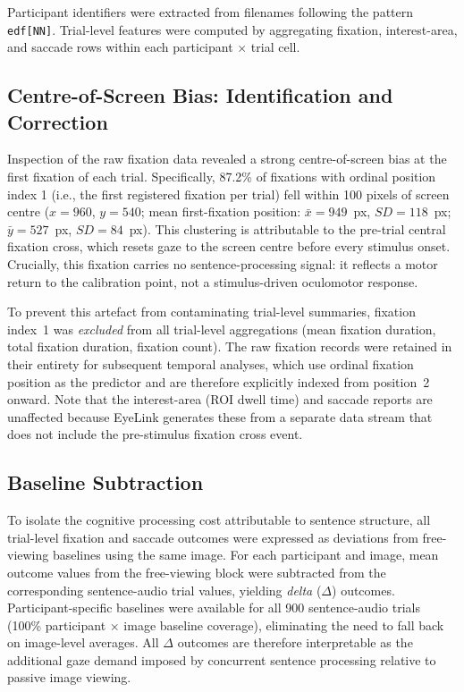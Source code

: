 \documentclass[12pt, a4paper]{article}
\begin{document}
Participant identifiers were extracted from filenames following the pattern
\texttt{edf[NN]}.
Trial-level features were computed by aggregating fixation, interest-area,
and saccade rows within each participant $\times$ trial cell.

\subsection{Centre-of-Screen Bias: Identification and Correction}

Inspection of the raw fixation data revealed a strong centre-of-screen
bias at the first fixation of each trial.
Specifically, 87.2\% of fixations with ordinal position index 1
(i.e., the first registered fixation per trial) fell within 100 pixels
of screen centre ($x = 960$, $y = 540$; mean first-fixation position:
$\bar{x} = 949$~px, $SD = 118$~px; $\bar{y} = 527$~px, $SD = 84$~px).
This clustering is attributable to the pre-trial central fixation cross,
which resets gaze to the screen centre before every stimulus onset.
Crucially, this fixation carries no sentence-processing signal: it reflects
a motor return to the calibration point, not a stimulus-driven oculomotor response.

To prevent this artefact from contaminating trial-level summaries,
fixation index~1 was \emph{excluded} from all trial-level aggregations
(mean fixation duration, total fixation duration, fixation count).
The raw fixation records were retained in their entirety for subsequent
temporal analyses, which use ordinal fixation position as the predictor
and are therefore explicitly indexed from position~2 onward.
Note that the interest-area (ROI dwell time) and saccade reports are
unaffected because EyeLink generates these from a separate data stream
that does not include the pre-stimulus fixation cross event.

\subsection{Baseline Subtraction}

To isolate the cognitive processing cost attributable to sentence structure,
all trial-level fixation and saccade outcomes were expressed as deviations
from free-viewing baselines using the same image.
For each participant and image, mean outcome values from the free-viewing
block were subtracted from the corresponding sentence-audio trial values,
yielding \emph{delta} ($\Delta$) outcomes.
Participant-specific baselines were available for all 900 sentence-audio
trials (100\% participant $\times$ image baseline coverage), eliminating
the need to fall back on image-level averages.
All $\Delta$ outcomes are therefore interpretable as the additional gaze
demand imposed by concurrent sentence processing relative to passive
image viewing.
\end{document}
